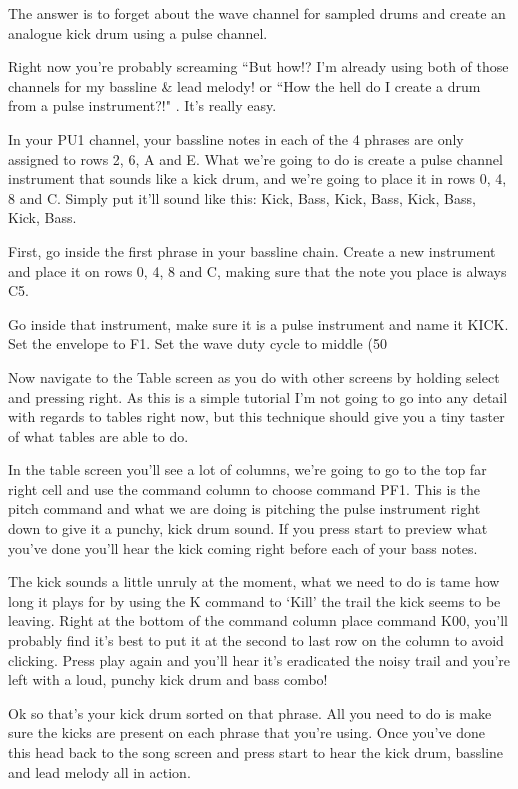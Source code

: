\documentclass[]{article}
\begin{document}
The answer is to forget about the wave channel for sampled drums and create an analogue kick drum using a pulse channel.

Right now you’re probably screaming “But how!? I’m already using both of those channels for my bassline \& lead melody! or “How the hell do I create a drum from a pulse instrument?!" . It’s really easy.

In your PU1 channel, your bassline notes in each of the 4 phrases are only assigned to rows 2, 6, A and E. What we’re going to do is create a pulse channel instrument that sounds like a kick drum, and we’re going to place it in rows 0, 4, 8 and C. Simply put it’ll sound like this: Kick, Bass, Kick, Bass, Kick, Bass, Kick, Bass.

First, go inside the first phrase in your bassline chain. Create a new instrument and place it on rows 0, 4, 8 and C, making sure that the note you place is always C5.

Go inside that instrument, make sure it is a pulse instrument and name it KICK. Set the envelope to F1. Set the wave duty cycle to middle (50%

Now navigate to the Table screen as you do with other screens by holding select and pressing right. As this is a simple tutorial I’m not going to go into any detail with regards to tables right now, but this technique should give you a tiny taster of what tables are able to do.

In the table screen you’ll see a lot of columns, we’re going to go to the top far right cell and use the command column to choose command PF1. This is the pitch command and what we are doing is pitching the pulse instrument right down to give it a punchy, kick drum sound. If you press start to preview what you’ve done you’ll hear the kick coming right before each of your bass notes.

The kick sounds a little unruly at the moment, what we need to do is tame how long it plays for by using the K command to ‘Kill’ the trail the kick seems to be leaving. Right at the bottom of the command column place command K00, you’ll probably find it’s best to put it at the second to last row on the column to avoid clicking. Press play again and you’ll hear it’s eradicated the noisy trail and you’re left with a loud, punchy kick drum and bass combo!

Ok so that’s your kick drum sorted on that phrase. All you need to do is make sure the kicks are present on each phrase that you’re using. Once you’ve done this head back to the song screen and press start to hear the kick drum, bassline and lead melody all in action.
\end{document}
